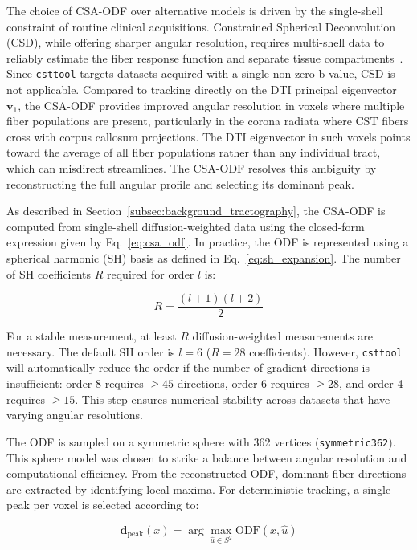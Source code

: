 The choice of CSA-ODF over alternative models is driven by the single-shell constraint of routine clinical acquisitions. Constrained Spherical Deconvolution (CSD), while offering sharper angular resolution, requires multi-shell data to reliably estimate the fiber response function and separate tissue compartments~\cite{tournier2007robust}. Since \texttt{csttool} targets datasets acquired with a single non-zero b-value, CSD is not applicable. Compared to tracking directly on the DTI principal eigenvector $\mathbf{v}_1$, the CSA-ODF provides improved angular resolution in voxels where multiple fiber populations are present, particularly in the corona radiata where CST fibers cross with corpus callosum projections. The DTI eigenvector in such voxels points toward the average of all fiber populations rather than any individual tract, which can misdirect streamlines. The CSA-ODF resolves this ambiguity by reconstructing the full angular profile and selecting its dominant peak.

As described in Section~\ref{subsec:background_tractography}, the CSA-ODF is computed from single-shell diffusion-weighted data using the closed-form expression given by Eq.~\ref{eq:csa_odf}. In practice, the ODF is represented using a spherical harmonic (SH) basis as defined in Eq.~\ref{eq:sh_expansion}. The number of SH coefficients $R$ required for order $l$ is:

\begin{equation}
	R = \frac{(l+1)(l+2)}{2}
	\label{eq:sh_coeff_count}
\end{equation}

For a stable measurement, at least $R$ diffusion-weighted measurements are necessary. The default SH order is $l=6$ ($R=28$ coefficients). However, \texttt{csttool} will automatically reduce the order if the number of gradient directions is insufficient: order 8 requires $\geq 45$ directions, order 6 requires $\geq 28$, and order 4 requires $\geq 15$. This step ensures numerical stability across datasets that have varying angular resolutions.

The ODF is sampled on a symmetric sphere with 362 vertices (\texttt{symmetric362}). This sphere model was chosen to strike a balance between angular resolution and computational efficiency. From the reconstructed ODF, dominant fiber directions are extracted by identifying local maxima. For deterministic tracking, a single peak per voxel is selected according to:

\begin{equation}
	\mathbf{d}_{\text{peak}}(x) = \arg\max_{\hat{u} \in S^2} \text{ODF}(x, \hat{u})
	\label{eq:peak_detection}
\end{equation}

